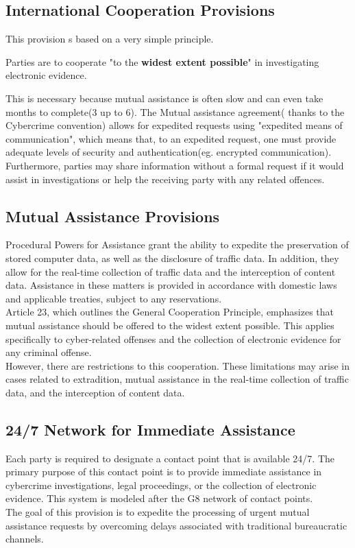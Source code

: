 \subsection{International Cooperation Provisions}
This provision s based on a very simple principle.
\begin{boxH}
  Parties are to cooperate "to the \textbf{widest extent possible}" in
  investigating electronic evidence.
\end{boxH}
This is necessary because mutual assistance is often slow and can even
take months to complete(3 up to 6).  The Mutual assistance agreement(
thanks to the Cybercrime convention) allows for expedited requests
using "expedited means of communication", which means that, to an
expedited request, one must provide adequate levels of security and
authentication(eg. encrypted communication).\\
Furthermore, parties may share information without a formal request if
it would assist in investigations or help the receiving party with any
related offences.
\subsection{Mutual Assistance Provisions}
Procedural Powers for Assistance grant the ability to expedite the
preservation of stored computer data, as well as the disclosure of
traffic data. In addition, they allow for the real-time collection of
traffic data and the interception of content data. Assistance in these
matters is provided in accordance with domestic laws and applicable
treaties, subject to any reservations.\\
Article 23, which outlines the General Cooperation Principle,
emphasizes that mutual assistance should be offered to the widest
extent possible. This applies specifically to cyber-related offenses
and the collection of electronic evidence for any criminal offense.\\
However, there are restrictions to this cooperation. These limitations
may arise in cases related to extradition, mutual assistance in the
real-time collection of traffic data, and the interception of content
data.
\subsection{24/7 Network for Immediate Assistance}
Each party is required to designate a contact point that is available
24/7. The primary purpose of this contact point is to provide
immediate assistance in cybercrime investigations, legal proceedings,
or the collection of electronic evidence. This system is modeled after
the G8 network of contact points.\\
The goal of this provision is to expedite the processing of urgent
mutual assistance requests by overcoming delays associated with
traditional bureaucratic channels.

